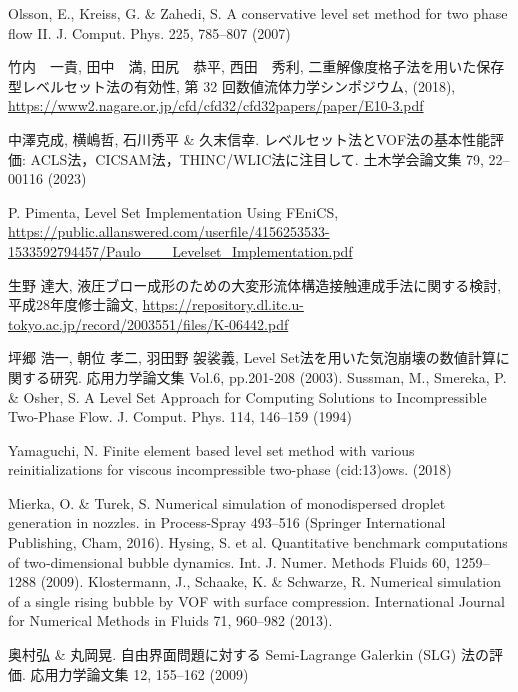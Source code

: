 \documentclass[8pt,a4paper]{article}
\begin{document}
\begin{thebibliography}{99}
	 Olsson, E., Kreiss, G. \& Zahedi, S. A conservative level set method for two phase flow II. J. Comput. Phys. 225, 785–807 (2007)

	 竹内　一貴, 田中　満, 田尻　恭平, 西田　秀利, 二重解像度格子法を用いた保存型レベルセット法の有効性, 第 32 回数値流体力学シンポジウム, (2018), \url{https://www2.nagare.or.jp/cfd/cfd32/cfd32papers/paper/E10-3.pdf}

	 中澤克成, 横嶋哲, 石川秀平 \& 久末信幸. レベルセット法とVOF法の基本性能評価: ACLS法，CICSAM法，THINC/WLIC法に注目して. 土木学会論文集 79, 22–00116 (2023)

	 P. Pimenta, Level Set Implementation Using FEniCS, \url{https://public.allanswered.com/userfile/4156253533-1533592794457/Paulo___Levelset_Implementation.pdf}

	 生野 達大, 液圧ブロー成形のための大変形流体構造接触連成手法に関する検討, 平成28年度修士論文, \url{https://repository.dl.itc.u-tokyo.ac.jp/record/2003551/files/K-06442.pdf}

	 坪郷 浩一, 朝位 孝二, 羽田野 袈裟義, Level Set法を用いた気泡崩壊の数値計算に関する研究. 応用力学論文集 Vol.6, pp.201-208 (2003).
	 Sussman, M., Smereka, P. \& Osher, S. A Level Set Approach for Computing Solutions to Incompressible Two-Phase Flow. J. Comput. Phys. 114, 146–159 (1994)

	 Yamaguchi, N. Finite element based level set method with various reinitializations for viscous incompressible two-phase (cid:13)ows. (2018)

	 Mierka, O. \& Turek, S. Numerical simulation of monodispersed droplet generation in nozzles. in Process-Spray 493–516 (Springer International Publishing, Cham, 2016).
	 Hysing, S. et al. Quantitative benchmark computations of two‐dimensional bubble dynamics. Int. J. Numer. Methods Fluids 60, 1259–1288 (2009).
	 Klostermann, J., Schaake, K. \& Schwarze, R. Numerical simulation of a single rising bubble by VOF with surface compression. International Journal for Numerical Methods in Fluids 71, 960–982 (2013).

	 奥村弘 \& 丸岡晃. 自由界面問題に対する Semi-Lagrange Galerkin (SLG) 法の評価. 応用力学論文集 12, 155–162 (2009)


\end{thebibliography}
\end{document}
